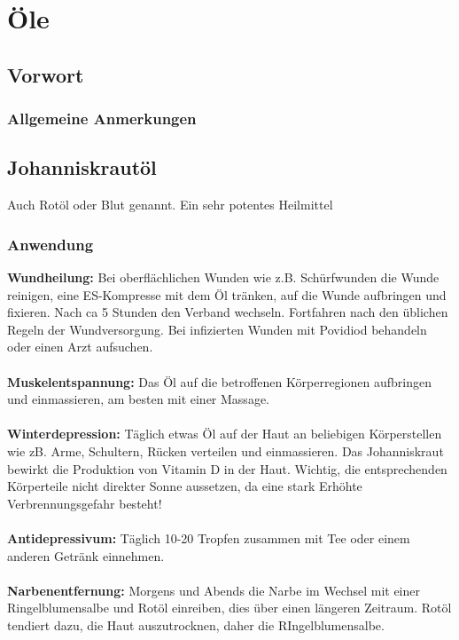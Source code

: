 \chapter{Öle}

\section{Vorwort}

\lipsum[1-5]
\newpage





\subsection{Allgemeine Anmerkungen}





\section{Johanniskrautöl}

Auch Rotöl oder Blut genannt. Ein sehr potentes Heilmittel

\subsection{Anwendung}

\textbf{Wundheilung:} Bei oberflächlichen Wunden wie z.B. Schürfwunden die Wunde reinigen, eine ES-Kompresse mit dem Öl tränken, auf die Wunde aufbringen und fixieren. Nach ca 5 Stunden den Verband wechseln. Fortfahren nach den üblichen Regeln der Wundversorgung. Bei infizierten Wunden mit Povidiod behandeln oder einen Arzt aufsuchen.\\ \\
\textbf{Muskelentspannung:} Das Öl auf die betroffenen Körperregionen aufbringen und einmassieren, am besten mit einer Massage. \\ \\
\textbf{Winterdepression:} Täglich etwas Öl auf der Haut an beliebigen Körperstellen wie zB. Arme, Schultern, Rücken verteilen und einmassieren. Das Johanniskraut bewirkt die Produktion von Vitamin D in der Haut. Wichtig, die entsprechenden Körperteile nicht direkter Sonne aussetzen, da eine stark Erhöhte Verbrennungsgefahr besteht! \\ \\
\textbf{Antidepressivum:} Täglich 10-20 Tropfen zusammen mit Tee oder einem anderen Getränk einnehmen. \\ \\
\textbf{Narbenentfernung:} Morgens und Abends die Narbe im Wechsel mit einer Ringelblumensalbe und Rotöl einreiben, dies über einen längeren Zeitraum. Rotöl tendiert dazu, die Haut auszutrocknen, daher die RIngelblumensalbe.

